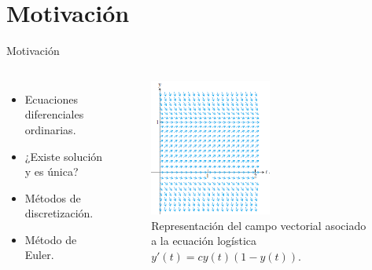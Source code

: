 
\section{Motivación}

{
	
	\begin{frame}{Motivación}
		\begin{columns}
			\begin{itemize}
				\item Ecuaciones diferenciales ordinarias.
				\item ¿Existe solución y es única?
				\item Métodos de discretización.
				\item Método de Euler.		
			\end{itemize}
			
			
			\begin{figure}[h]
				\centering
				\includegraphics[width=4cm]{./Images/interpret-pvi.png}
					\caption{Representación del campo vectorial asociado a la ecuación logística $y'(t) = c y(t) (1 - y(t))$.} 
			\end{figure}
		\end{columns}			
	\end{frame}
}
		

